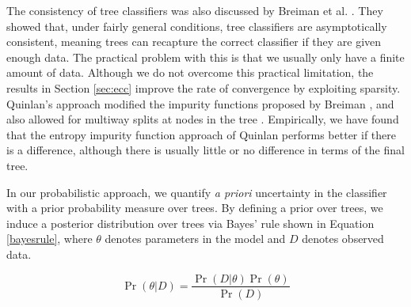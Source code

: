 The consistency of tree classifiers was also discussed by Breiman et al. \cite{breiman1984classification}. They showed that, under fairly general conditions, tree classifiers are asymptotically consistent, meaning trees can recapture the correct classifier if they are given enough data. The practical problem with this is that we usually only have a finite amount of data. Although we do not overcome this practical limitation, the results in Section \ref{sec:ecc} improve the rate of convergence by exploiting sparsity. Quinlan's approach modified the impurity functions proposed by Breiman \cite{breiman1984classification}, and also allowed for multiway splits at nodes in the tree \cite{quinlan1993c4}. Empirically, we have found that the entropy impurity function approach of Quinlan \cite{quinlan1993c4} performs better if there is a difference, although there is usually little or no difference in terms of the final tree. 

In our probabilistic approach, we quantify \emph{a priori} uncertainty in the classifier with a prior probability measure over trees. By defining a prior over trees, we induce a posterior distribution over trees via Bayes' rule shown in Equation \ref{bayesrule}, where $\theta$ denotes parameters in the model and $D$ denotes observed data.

\begin{equation}\label{bayesrule}
\Pr(\theta \vert D ) = \frac{\Pr(D\vert \theta )\Pr(\theta)}{\Pr(D)}
\end{equation}

